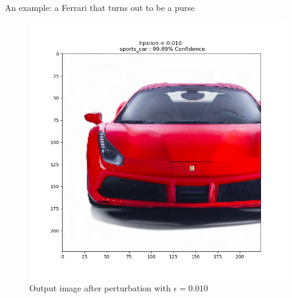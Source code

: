 \documentclass[8pt]{beamer}
\begin{document}
\begin{frame}{An example: a Ferrari that turns out to be a purse}
\begin{figure} 
    \includegraphics[scale=0.3]{images/output_1.png}
    \vspace*{-5mm}
    \caption{Output image after perturbation with $\epsilon=0.010$}
\end{figure}
\end{frame}
\end{document}
